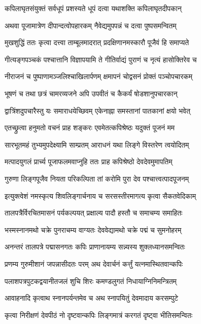 \twolineshloka
{कपिलाघृतसंयुक्तं सर्वधूपं प्रशस्यते}
{धूपं दत्वा यथाशक्ति कपिलाघृतदीपकान्}%

\twolineshloka
{अथवा पूजामात्रेण दीपान्दत्वोपहारकम्}
{नैवेद्यमुपपन्नं च दत्वा पुष्पसमन्वितम्}%

\twolineshloka
{मुखशुद्धिं ततः कृत्वा दत्त्वा ताम्बूलमादरात्}
{प्रदक्षिणानमस्कारौ पूजैवं हि समाप्यते}%

\twolineshloka
{गीत्यङ्गपञ्चकं पश्चात्तानि विज्ञापयामि ते}
{गीतिर्वाद्यं पुराणं च नृत्यं हासोक्तिरेव च}%

\twolineshloka
{नीराजनं च पुष्पाणामञ्जलिश्चाखिलार्पणम्}
{क्षमापनं चोद्वसनं प्रोक्तं पञ्चोपचारकम्}%

\twolineshloka
{भूषणं च तथा छत्रं चामरव्यजने अपि}
{उपवीतं च कैकर्यं षोडशानुपचारकान्}%

\twolineshloka
{द्वात्रिंशदुपचारैस्तु यः समाराधयेच्छिवम्}
{एकेनाह्ना समस्तानां पातकानां क्षयो भवेत्}%

\twolineshloka
{एतच्छ्रुत्वा हनुमतो वचनं प्राह शङ्करः}
{एवमेतत्कपिश्रेष्ठः यदुक्तं पूजनं मम}%

\twolineshloka
{सारभूतमहं तुभ्यमुपदेक्ष्यामि साम्प्रतम्}
{आराधनं यथा लिङ्गे विस्तरेण त्वयोदितम्}%

\twolineshloka
{मत्पादयुगलं प्रार्च्य पूजाफलमवाप्नुहि}
{ततः प्राह कपिश्रेष्ठो देवदेवमुमापतिम्}%

\twolineshloka
{गुरुणा लिङ्गपूजैव नियता परिकल्पिता}
{तां करोमि पुरा देव पश्चात्त्वत्पादपूजनम्}%

\twolineshloka
{इत्युक्त्वेशं नमस्कृत्य शिवलिङ्गार्चनाय च}
{सरसस्तीरमागत्य कृत्वा सैकतवेदिकाम्}%

\twolineshloka
{तालपत्रैर्विरचितमासनं पर्यकल्पयत्}
{प्रक्षाल्य पादौ हस्तौ च समाचम्य समाहितः}%

\twolineshloka
{भस्मस्नानमथो चक्रे पुनराचम्य वाग्यतः}
{देववेद्यामथो चक्रे पद्मं च सुमनोहरम्}%

\twolineshloka
{अनन्तरं तालपत्रे पद्मासनगतः कपिः}
{प्राणानायम्य सन्न्यस्य शुक्लध्यानसमन्वितः}%

\twolineshloka
{प्रणम्य गुरुमीशानं जपन्नासीदतः परम्}
{अथ देवार्चनं कर्त्तुं यत्नमास्थितवान्कपिः}%

\twolineshloka
{पलाशपत्रपुटकद्वयानीतजलं शुचि}
{शिरः कमण्डलुगतं निधायाग्निनिमन्त्रितम्}%

\twolineshloka
{आवाहनादि कृत्वाथ स्नानपर्यन्तमेव च}
{अथ स्नापयितुं देवमादाय करसम्पुटे}%

\twolineshloka
{कृत्वा निरीक्षणं देवपीठं नो दृष्टवान्कपिः}
{लिङ्गमात्रं करगतं दृष्ट्वा भीतिसमन्वितः}%

